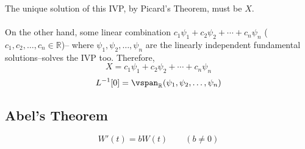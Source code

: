 \documentclass[12pt]{article}
\begin{document}
The unique solution of this IVP, by Picard's Theorem, must be $X$. \\ \\
On the other hand, some linear combination $c_1\psi_1 + c_2\psi_2 + \cdots + c_n\psi_n$ ($c_1,c_2,\dots,c_n \in \mathbb{R}$)-- where $\psi_1,\psi_2,\dots,\psi_n$ are the linearly independent fundamental solutions--solves the IVP too. Therefore, \[ X = c_1\psi_1 + c_2\psi_2 + \cdots + c_n\psi_n \]
\[ L^{-1}[0] = \vspan_{\mathbb{R}}(\psi_1,\psi_2,\dots,\psi_n) \]

\subsection{Abel's Theorem}
\begin{theorem}
\[ W'(t) = bW(t) \qquad (b \neq 0)\]
\end{theorem}
\end{document}

